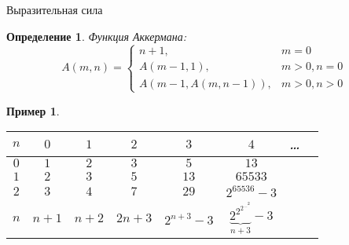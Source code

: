 \documentclass[aspectratio=169]{beamer}
\newtheorem{thm}{Теорема}[section]
\newtheorem{dfn}{Определение}[section]
\newtheorem{exm}{Пример}[section]
\begin{document}
\begin{frame}{Выразительная сила}
\begin{dfn}
Функция Аккермана:
$$A(m,n) = \left\{\begin{array}{ll}
  n+1,&m = 0\\
  A(m-1,1),&m > 0, n = 0\\
  A(m-1,A(m,n-1)),&m > 0, n > 0
\end{array}\right.$$
\end{dfn}


\begin{exm}
\begin{tabular}{cccccccc}
$n$ & $0$ & $1$ & $2$ & $3$ & $4$ & \dots \\\hline
$0$ & $1$ & $2$ & $3$ & $5$ & $13$   \\
$1$ & $2$ & $3$ & $5$ & $13$ & $65533$ \\
$2$ & $3$ & $4$ & $7$ & $29$ & $2^{65536}-3$ \\
$n$ & $n+1$ & $n+2$ & $2n+3$ & $2^{n+3}-3$ & $\underbrace{2^{2^{2^{\dots^2}}}}_{n+3}-3$
\end{tabular}
\end{exm}
\end{frame}
\end{document}
